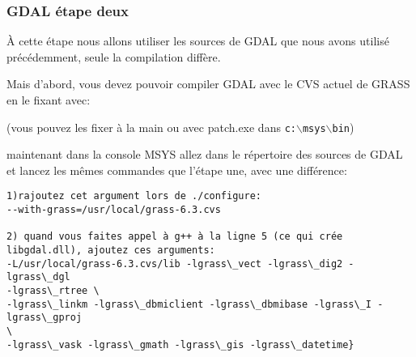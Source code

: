 % 
% 
% 

\subsubsection{GDAL étape deux}
À cette étape nous allons utiliser les sources de GDAL que nous avons utilisé précédemment, seule la compilation diffère.

Mais d'abord, vous devez pouvoir compiler GDAL avec le CVS actuel de GRASS en le fixant avec:

 \begin{quotation}
 \end{quotation}
(vous pouvez les fixer à la main ou avec patch.exe dans \texttt{c:$\backslash$msys$\backslash$bin})

maintenant dans la console MSYS allez dans le répertoire des sources de GDAL et lancez les mêmes commandes que l'étape une, avec une différence:

\begin{verbatim}
1)rajoutez cet argument lors de ./configure:
--with-grass=/usr/local/grass-6.3.cvs

2) quand vous faites appel à g++ à la ligne 5 (ce qui crée libgdal.dll), ajoutez ces arguments: 
-L/usr/local/grass-6.3.cvs/lib -lgrass\_vect -lgrass\_dig2 -lgrass\_dgl
-lgrass\_rtree \
-lgrass\_linkm -lgrass\_dbmiclient -lgrass\_dbmibase -lgrass\_I -lgrass\_gproj
\ 
-lgrass\_vask -lgrass\_gmath -lgrass\_gis -lgrass\_datetime}
\end{verbatim}

